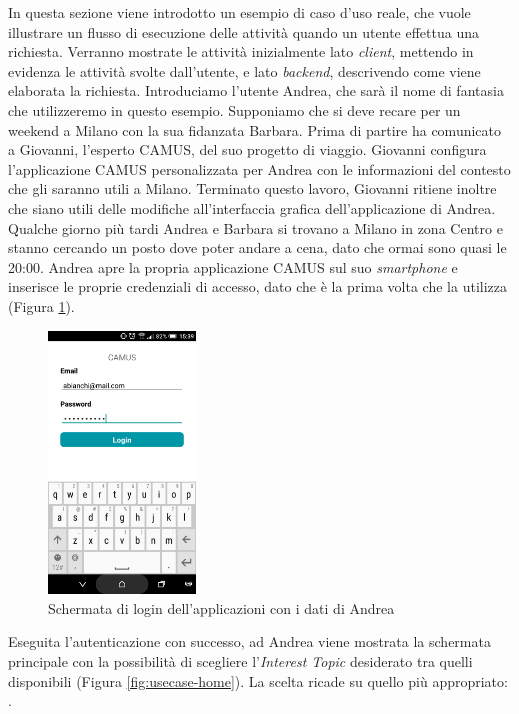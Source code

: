 In questa sezione viene introdotto un esempio di caso d'uso reale, che vuole illustrare un flusso di esecuzione delle attività quando un utente effettua una richiesta. Verranno mostrate le attività inizialmente lato \emph{client}, mettendo in evidenza le attività svolte dall’utente, e lato \emph{backend}, descrivendo come viene elaborata la richiesta.
Introduciamo l'utente Andrea, che sarà il nome di fantasia che utilizzeremo in questo esempio. Supponiamo che si deve recare per un weekend a Milano con la sua fidanzata Barbara. Prima di partire ha comunicato a Giovanni, l’esperto CAMUS, del suo progetto di viaggio. Giovanni configura l’applicazione CAMUS personalizzata per Andrea con le informazioni del contesto che gli saranno utili a Milano. Terminato questo lavoro, Giovanni ritiene inoltre che siano utili delle modifiche all'interfaccia grafica dell'applicazione di Andrea.
Qualche giorno più tardi Andrea e Barbara si trovano a Milano in zona Centro e stanno cercando un posto dove poter andare a cena, dato che ormai sono quasi le 20:00. Andrea apre la propria applicazione CAMUS sul suo \textit{smartphone} e inserisce le proprie credenziali di accesso, dato che è la prima volta che la utilizza (Figura \ref{fig:usecase-login}). 

\begin{figure}[H]
	\centering
	\includegraphics[width=0.35\textwidth]{4-progettazione-alto-livello/Immagini/login_caso_d'uso.png}
	\caption{Schermata di login dell'applicazioni con i dati di Andrea}\label{fig:usecase-login}
\end{figure}

Eseguita l’autenticazione con successo, ad Andrea viene mostrata la schermata principale con la possibilità di scegliere l'\emph{Interest Topic} desiderato tra quelli disponibili (Figura \ref{fig:usecase-home}). La scelta ricade su quello più appropriato: .

